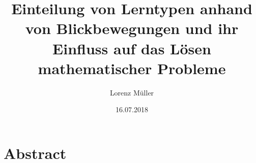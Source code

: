 %
% 
% 
%



\renewcommand{\Thema}{%
    Einteilung von Lerntypen anhand von Blickbewegungen und ihr Einfluss auf das Lösen 
    mathematischer Probleme}






\title{Einteilung von Lerntypen anhand von Blickbewegungen und ihr Einfluss auf das Lösen 
        mathematischer Probleme}
\author{Lorenz Müller}
\date{16.07.2018}




\section*{Abstract}

